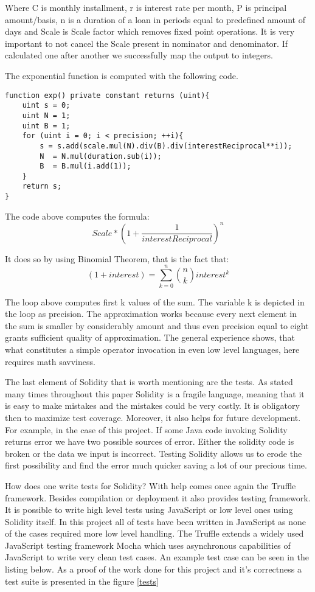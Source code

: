 \documentclass[a4paper,12pt,twoside,openany]{report}
\begin{document}
Where C is monthly installment, r is interest rate per month, P is principal amount/basis, n is a duration of a loan in periods equal to predefined amount of days and Scale is Scale factor which removes fixed point operations. It is very important to not cancel the Scale present in nominator and denominator. If calculated one after another we successfully map the output to integers.

\newpage
The exponential function is computed with the following code.
\begin{lstlisting}
function exp() private constant returns (uint){
	uint s = 0;
	uint N = 1;
	uint B = 1;
	for (uint i = 0; i < precision; ++i){
		s = s.add(scale.mul(N).div(B).div(interestReciprocal**i));
	    N  = N.mul(duration.sub(i));
	    B  = B.mul(i.add(1));
	}
	return s;
}
\end{lstlisting}

The code above computes the formula:
\[	Scale * (1 + \frac{1}{interestReciprocal})^n \]

It does so by using Binomial Theorem, that is the fact that:
\[	(1 + interest) = \sum_{k=0}^n {n \choose k} interest^k \]

The loop above computes first k values of the sum. The variable k is depicted in the loop as precision. The approximation works because every next element in the sum is smaller by considerably amount and thus even precision equal to eight grants sufficient quality of approximation. The general experience shows, that what constitutes a simple operator invocation in even low level languages, here requires math savviness.

The last element of Solidity that is worth mentioning are the tests. As stated many times throughout this paper Solidity is a fragile language, meaning that it is easy to make mistakes and the mistakes could be very costly. It is obligatory then to maximize test coverage. Moreover, it also helps for future development. For example, in the case of this project. If some Java code invoking Solidity returns error we have two possible sources of error. Either the solidity code is broken or the data we input is incorrect. Testing Solidity allows us to erode the first possibility and find the error much quicker saving a lot of our precious time. 

How does one write tests for Solidity? With help comes once again the Truffle framework. Besides compilation or deployment it also provides testing framework. It is possible to write high level tests using JavaScript or low level ones using Solidity itself. In this project all of tests have been written in JavaScript as none of the cases required more low level handling. The Truffle extends a widely used JavaScript testing framework Mocha which uses asynchronous capabilities of JavaScript to write very clean test cases. An example test case can be seen in the listing below. As a proof of the work done for this project and it's correctness a test suite is presented in the figure \ref{tests}
\end{document}
